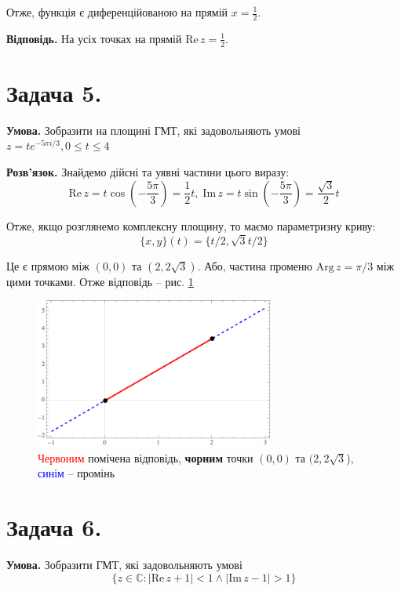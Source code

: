 \documentclass[14pt]{extarticle}
\begin{document}
Отже, функція є диференційованою на прямій $x=\frac{1}{2}$.

\textbf{Відповідь.} На усіх точках на прямій $\text{Re} \, z = \frac{1}{2}$.

\pagebreak
\section*{Задача 5.}

\textbf{Умова.} Зобразити на площині ГМТ, які задовольняють умові $z=te^{-5\pi i/3},0 \leq t \leq 4$

\textbf{Розв'язок.} Знайдемо дійсні та уявні частини цього виразу:
\[
\text{Re} \, z = t \cos\left(-\frac{5\pi}{3}\right) = \frac{1}{2}t, \; \text{Im} \, z = t \sin\left(-\frac{5\pi}{3}\right) = \frac{\sqrt{3}}{2}t
\]

Отже, якщо розглянемо комплексну площину, то маємо параметризну криву:
\[
\{x,y\}(t) = \{t/2,\sqrt{3}t/2\}
\]

Це є прямою між $(0,0)$ та $(2,2\sqrt{3})$. Або, частина променю $\text{Arg}\, z = \pi/3$ між цими точками. Отже відповідь -- рис. \ref{fig:5}

\begin{figure}[H]
    \centering
    \includegraphics[width=0.7\textwidth]{images/test_1/plot_1.png}
    \caption{\textcolor{red}{Червоним} помічена відповідь, \textbf{чорним} точки $(0,0)$ та $(2,2\sqrt{3}$), \textcolor{blue}{синім} -- промінь}
    \label{fig:5}
\end{figure}
\vspace{5px}

\pagebreak
\section*{Задача 6.}

\textbf{Умова.} Зобразити ГМТ, які задовольняють умові
\[
\{z \in \mathbb{C}: |\text{Re}\, z + 1| < 1 \wedge |\text{Im}\, z - 1| > 1\}
\]
\end{document}
